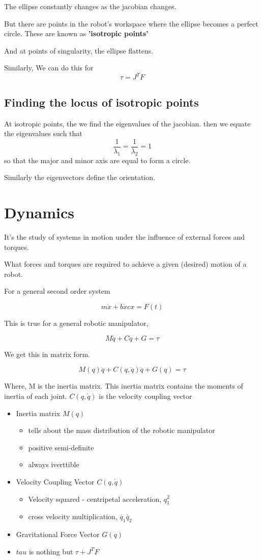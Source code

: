 \documentclass[11pt]{report}
\begin{document}
The ellipse constantly changes as the jacobian changes.

But there are points in the robot's workspace where the ellipse becomes a perfect circle. These are known as \textbf{'isotropic points'}

And at points of singularity, the ellipse flattens.

Similarly,
We can do this for
$$\tau = J^T F$$
\section{Finding the locus of isotropic points}
\label{sec:orgac1d520}
At isotropic points, the we find the eigenvalues of the jacobian. then we equate the eigenvalues such that $$\frac{1}{\lambda_{1}} = \frac{1}{\lambda_2}=1$$ so that the major and minor axis are equal to form a circle.

Similarly the eigenvectors define the orientation.
\chapter{Dynamics}
\label{sec:orgd3d37dd}
It's the study of systems in motion under the influence of external forces and torques.

What forces and torques are required to achieve a given (desired) motion of a robot.

For a general second order system

\[ m\ddot{x} + b \dot{x} c x = F(t) \]

This is true for a general robotic manipulator,

$$M \ddot{q} + C \dot{q} + G = \tau$$

We get this in matrix form.

$$M(q) \ddot{q} + C(q,\dot{q})\dot{q} + G(q) = \tau$$

Where, M is the inertia matrix. This inertia matrix contains the moments of inertia of each joint. \(C(q,\dot{q})\) is the velocity coupling vector

\begin{itemize}
\item Inertia matrix \(M(q)\)
\begin{itemize}
\item tells about the mass distribution of the robotic manipulator
\item positive semi-definite
\item always iverttible
\end{itemize}
\item Velocity Coupling Vector \(C(q,\dot{q})\)
\begin{itemize}
\item Velocity squared - centripetal acceleration, \(q_{1}^2\)
\item cross velocity multiplication, \(\dot{q_1}\dot{q_2}\)
\end{itemize}
\item Gravitational Force Vector \(G(q)\)
\item \(tau\) is nothing but \(\tau + J^TF\)
\end{itemize}
\end{document}

